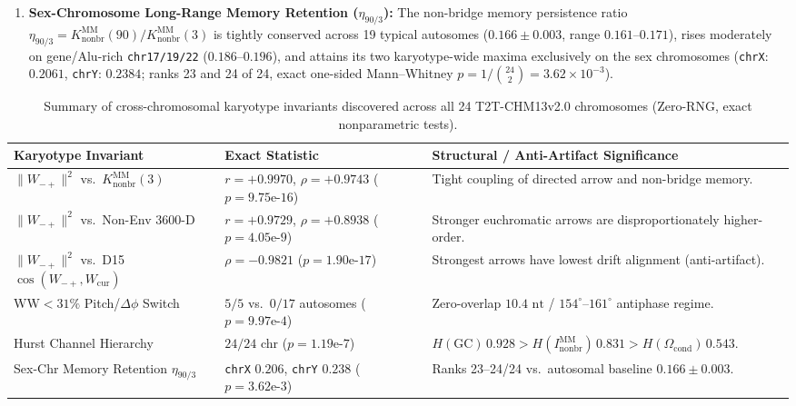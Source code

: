 \documentclass[11pt,a4paper]{article}
\newcommand{\Wmp}{W_{-+}}
\newcommand{\Inb}{I_{\mathrm{nonbr}}^{\mathrm{MM}}}
\begin{document}
\begin{enumerate}[label=(\arabic*),noitemsep,topsep=2pt]
  \item \textbf{Sex-Chromosome Long-Range Memory Retention ($\eta_{90/3}$):} The non-bridge memory persistence ratio $\eta_{90/3} = K_{\mathrm{nonbr}}^{\mathrm{MM}}(90)/K_{\mathrm{nonbr}}^{\mathrm{MM}}(3)$ is tightly conserved across 19 typical autosomes ($0.166\pm 0.003$, range $0.161$--$0.171$), rises moderately on gene/Alu-rich \texttt{chr17/19/22} ($0.186$--$0.196$), and attains its two karyotype-wide maxima exclusively on the sex chromosomes (\texttt{chrX}: $0.2061$, \texttt{chrY}: $0.2384$; ranks 23 and 24 of 24, exact one-sided Mann--Whitney $p = 1/\binom{24}{2} = 3.62\times 10^{-3}$).
\end{enumerate}

\begin{table}[htbp]
\centering
\caption{Summary of cross-chromosomal karyotype invariants discovered across all 24 T2T-CHM13v2.0 chromosomes (Zero-RNG, exact nonparametric tests).}
\label{tab:laws}
\scriptsize
\begin{tabularx}{\textwidth}{@{}llX@{}}
\toprule
\textbf{Karyotype Invariant} & \textbf{Exact Statistic} & \textbf{Structural / Anti-Artifact Significance} \\
\midrule
$\|\Wmp\|^2$ vs.\ $K_{\mathrm{nonbr}}^{\mathrm{MM}}(3)$ & $r=+0.9970$, $\rho=+0.9743$ ($p=9.75\text{e-}16$) & Tight coupling of directed arrow and non-bridge memory. \\
$\|\Wmp\|^2$ vs.\ Non-Env 3600-D & $r=+0.9729$, $\rho=+0.8938$ ($p=4.05\text{e-}9$) & Stronger euchromatic arrows are disproportionately higher-order. \\
$\|\Wmp\|^2$ vs.\ D15 $\cos(\Wmp,W_{\mathrm{cur}})$ & $\rho=-0.9821$ ($p=1.90\text{e-}17$) & Strongest arrows have lowest drift alignment (anti-artifact). \\
$\mathrm{WW}<31\%$ Pitch/$\Delta\phi$ Switch & $5/5$ vs.\ $0/17$ autosomes ($p=9.97\text{e-}4$) & Zero-overlap $10.4\text{ nt}$ / $154^\circ$--$161^\circ$ antiphase regime. \\
Hurst Channel Hierarchy & $24/24$ chr ($p=1.19\text{e-}7$) & $H(\mathrm{GC})\,0.928 > H(\Inb)\,0.831 > H(\Omega_{\mathrm{cond}})\,0.543$. \\
Sex-Chr Memory Retention $\eta_{90/3}$ & \texttt{chrX} $0.206$, \texttt{chrY} $0.238$ ($p=3.62\text{e-}3$) & Ranks 23--24/24 vs.\ autosomal baseline $0.166\pm 0.003$. \\
\bottomrule
\end{tabularx}
\end{table}
\end{document}
